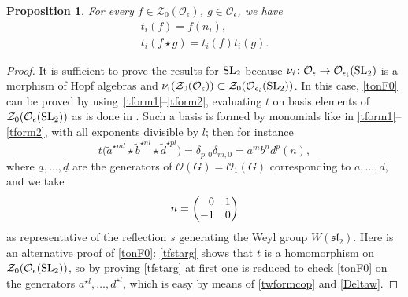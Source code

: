 \documentclass[10pt,a4paper]{amsart}
\numberwithin{equation}{section}
\newtheorem{prop}[teo]{Proposition}
\theoremstyle{definition}
\newcommand{\e}{\epsilon}
\newcommand{\Oo}{{\mathcal O}}
\begin{document}
\begin{prop}\label{tidstar} For every $f\in \mathcal{Z}_0(\Oo_\e)$, $g\in {\mathcal O}_\epsilon$, we have
\begin{gather}
t_i(f)=f(n_i), \label{tonF0} \\
t_i(f\star g)=t_i(f)t_i(g).\label{tfstarg}
\end{gather}
\end{prop}
\begin{proof} It is sufficient to prove the results for ${\rm SL}_2$ because $\nu_i\colon {\mathcal O}_\epsilon \rightarrow
{\mathcal O}_{\epsilon_i} ({\rm SL}_2)$ is a morphism of Hopf algebras and $\nu_i(\mathcal{Z}_0(\Oo_\e))\subset \mathcal{Z}_0(\Oo_{\e_i}({\rm SL}_2))$. In this case, \eqref{tonF0} can be proved by using~\mbox{\eqref{tform1}--\eqref{tform2}}, evaluating $t$ on basis elements of $\mathcal{Z}_0(\Oo_\e({\rm SL}_2))$ as is done in \cite[Lemma~1.5\,(a)]{DC-L}. Such a basis is formed by monomials like in \eqref{tform1}--\eqref{tform2}, with all exponents divisible by $l$; then for instance
\[t\big(\tilde{a}^{\star m l}\star \tilde{b}^{\star n l}\star \tilde{d}^{\star p l}\big)=\delta_{p,0}\delta_{m,0} = \underline{a}^m\underline{b}^n\underline{d}^p (n),
\]
where $\underline{a},\dots,\underline{d}$ are the generators of $\Oo(G) = \Oo_1(G)$ corresponding to $a,\dots,d$, and we take
\[n=\left(\begin{matrix} \hphantom{-}0 & 1 \\ -1 & 0\end{matrix}\right)\]
as representative of the reflection $s$ generating the Weyl group $W({\mathfrak{sl}_2})$. Here is an alternative proof of \eqref{tonF0}: \eqref{tfstarg} shows that $t$ is a homomorphism on $\mathcal{Z}_0(\Oo_\e({\rm SL}_2))$, so by proving \eqref{tfstarg} at first one is reduced to check \eqref{tonF0} on the generators $a^{\star l},\dots,d^{\star l}$, which is easy by means of \eqref{twformcop} and \eqref{Deltaw}.


\end{proof}
\end{document}
